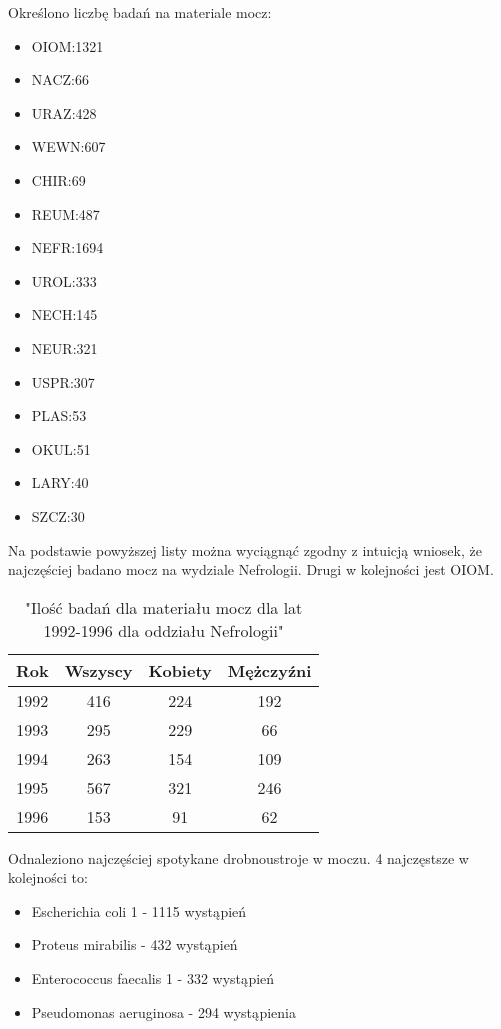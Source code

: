 \documentclass[a4paper,11pt]{article}
\begin{document}
Określono liczbę badań na materiale mocz:
\begin{itemize}
\item OIOM:1321
\item NACZ:66
\item URAZ:428
\item WEWN:607
\item CHIR:69
\item REUM:487
\item NEFR:1694
\item UROL:333
\item NECH:145
\item NEUR:321
\item USPR:307
\item PLAS:53
\item OKUL:51
\item LARY:40
\item SZCZ:30
\end{itemize}
Na podstawie powyższej listy można wyciągnąć zgodny z intuicją wniosek, że najczęściej badano mocz na wydziale Nefrologii. Drugi w kolejności jest OIOM.

\begin{table}[H]
  \begin{center}
  \caption{"Ilość badań dla materiału mocz dla lat 1992-1996 dla oddziału Nefrologii"}
  \begin{tabular}{|c|c|c|c|}
    \hline
    Rok & Wszyscy & Kobiety & Mężczyźni \\ \hline
1992 &416 &224 &192\\ \hline
1993 &295 &229 &66\\ \hline
1994 &263 &154 &109\\ \hline
1995 &567 &321 &246\\ \hline
1996 &153 &91 &62\\ \hline
  \end{tabular}
\end{center}
\end{table}


Odnaleziono najczęściej spotykane drobnoustroje w moczu. 4 najczęstsze w kolejności to:
\begin{itemize}
\item Escherichia coli 1 - 1115 wystąpień
\item Proteus mirabilis - 432 wystąpień
\item Enterococcus faecalis 1 - 332 wystąpień
\item Pseudomonas aeruginosa - 294 wystąpienia
\end{itemize}
\end{document}
